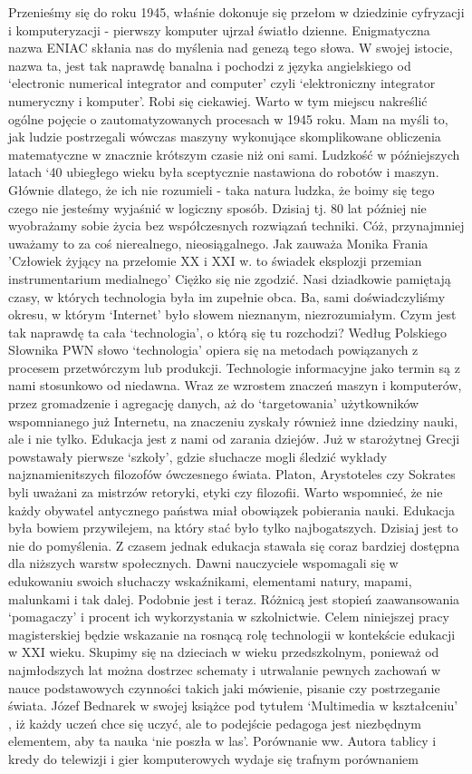 \documentclass{article}
\begin{document}
Przenieśmy się do roku 1945, właśnie dokonuje się przełom w dziedzinie cyfryzacji i komputeryzacji - pierwszy komputer ujrzał światło dzienne. Enigmatyczna nazwa ENIAC skłania nas do myślenia nad genezą tego słowa. W swojej istocie, nazwa ta, jest tak naprawdę banalna i pochodzi z języka angielskiego od ‘electronic numerical integrator and computer’ \cite{ref1} czyli ‘elektroniczny integrator numeryczny i komputer’. Robi się ciekawiej. Warto w tym miejscu nakreślić ogólne pojęcie o  zautomatyzowanych procesach w 1945 roku. Mam na myśli to, jak ludzie postrzegali wówczas maszyny wykonujące skomplikowane obliczenia matematyczne w znacznie krótszym czasie niż oni sami. Ludzkość w późniejszych latach ‘40 ubiegłego wieku była sceptycznie nastawiona do robotów i maszyn. Głównie dlatego, że ich nie rozumieli - taka natura ludzka, że boimy się tego czego nie jesteśmy wyjaśnić w logiczny sposób. Dzisiaj tj. 80 lat później nie wyobrażamy sobie życia bez współczesnych rozwiązań techniki. Cóż, przynajmniej uważamy to za coś nierealnego, nieosiągalnego. Jak zauważa Monika Frania 'Człowiek żyjący na przełomie XX i XXI w. to świadek eksplozji przemian instrumentarium medialnego' \cite{ref2} Ciężko się nie zgodzić. Nasi dziadkowie pamiętają czasy, w których technologia była im zupełnie obca. Ba, sami doświadczyliśmy okresu, w którym ‘Internet’ było słowem nieznanym, niezrozumiałym. Czym jest tak naprawdę ta cała ‘technologia’, o którą się tu rozchodzi? Według Polskiego Słownika PWN słowo ‘technologia’ \cite{ref3} opiera się na metodach powiązanych z procesem przetwórczym lub produkcji. Technologie informacyjne jako termin są z nami stosunkowo od niedawna. Wraz ze wzrostem znaczeń maszyn i komputerów, przez gromadzenie i agregację danych, aż do ‘targetowania’ użytkowników wspomnianego już Internetu, na znaczeniu zyskały również inne dziedziny nauki, ale i nie tylko. Edukacja jest z nami od zarania dziejów. Już w starożytnej Grecji powstawały pierwsze ‘szkoły’, gdzie słuchacze mogli śledzić wykłady najznamienitszych filozofów ówczesnego świata. Platon, Arystoteles czy Sokrates byli uważani za mistrzów retoryki, etyki czy filozofii. Warto wspomnieć, że nie każdy obywatel antycznego państwa miał obowiązek pobierania nauki. Edukacja była bowiem przywilejem, na który stać było tylko najbogatszych. Dzisiaj jest to nie do pomyślenia. Z czasem jednak edukacja stawała się coraz bardziej dostępna dla niższych warstw społecznych. Dawni nauczyciele wspomagali się w edukowaniu swoich słuchaczy wskaźnikami, elementami natury, mapami, malunkami i tak dalej. Podobnie jest i teraz. Różnicą jest stopień zaawansowania ‘pomagaczy’ i procent ich wykorzystania w szkolnictwie. Celem niniejszej pracy magisterskiej będzie wskazanie na rosnącą rolę technologii w kontekście edukacji w XXI wieku. Skupimy się na dzieciach w wieku przedszkolnym, ponieważ od najmłodszych lat można dostrzec schematy i utrwalanie pewnych zachowań w nauce podstawowych czynności takich jaki mówienie, pisanie czy postrzeganie świata. Józef Bednarek w swojej książce pod tytułem ‘Multimedia w kształceniu’  \cite{ref4} , iż każdy uczeń chce się uczyć, ale to podejście pedagoga jest niezbędnym elementem, aby ta nauka ‘nie poszła w las’. Porównanie ww. Autora tablicy i kredy do telewizji i gier komputerowych wydaje się trafnym porównaniem 
\end{document}
